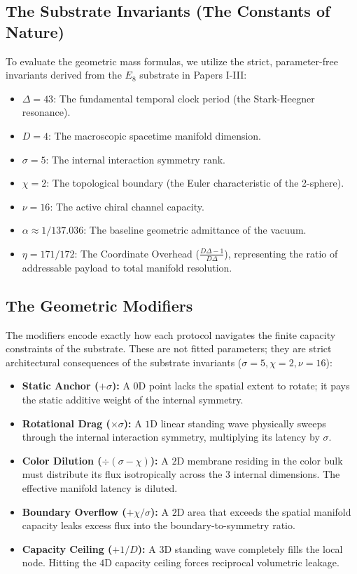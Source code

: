 \subsection{The Substrate Invariants (The Constants of Nature)}
To evaluate the geometric mass formulas, we utilize the strict, parameter-free invariants derived from the $E_8$ substrate in Papers I-III:
\begin{itemize}
    \item $\Delta = 43$: The fundamental temporal clock period (the Stark-Heegner resonance).
    \item $D = 4$: The macroscopic spacetime manifold dimension.
    \item $\sigma = 5$: The internal interaction symmetry rank.
    \item $\chi = 2$: The topological boundary (the Euler characteristic of the 2-sphere).
    \item $\nu = 16$: The active chiral channel capacity.
    \item $\alpha \approx 1/137.036$: The baseline geometric admittance of the vacuum.
    \item $\eta = 171/172$: The Coordinate Overhead ($\frac{D\Delta - 1}{D\Delta}$), representing the ratio of addressable payload to total manifold resolution.
\end{itemize}

\subsection{The Geometric Modifiers}
The modifiers encode exactly how each protocol navigates the finite capacity constraints of the substrate. These are not fitted parameters; they are strict architectural consequences of the substrate invariants ($\sigma=5, \chi=2, \nu=16$):

\begin{itemize}
    \item \textbf{Static Anchor ($+\sigma$):} A $0$D point lacks the spatial extent to rotate; it pays the static additive weight of the internal symmetry.
    \item \textbf{Rotational Drag ($\times\sigma$):} A $1$D linear standing wave physically sweeps through the internal interaction symmetry, multiplying its latency by $\sigma$.
    \item \textbf{Color Dilution ($\div (\sigma-\chi)$):} A $2$D membrane residing in the color bulk must distribute its flux isotropically across the 3 internal dimensions. The effective manifold latency is diluted.
    \item \textbf{Boundary Overflow ($+\chi/\sigma$):} A $2$D area that exceeds the spatial manifold capacity leaks excess flux into the boundary-to-symmetry ratio.
    \item \textbf{Capacity Ceiling ($+1/D$):} A $3$D standing wave completely fills the local node. Hitting the $4$D capacity ceiling forces reciprocal volumetric leakage.
\end{itemize}

